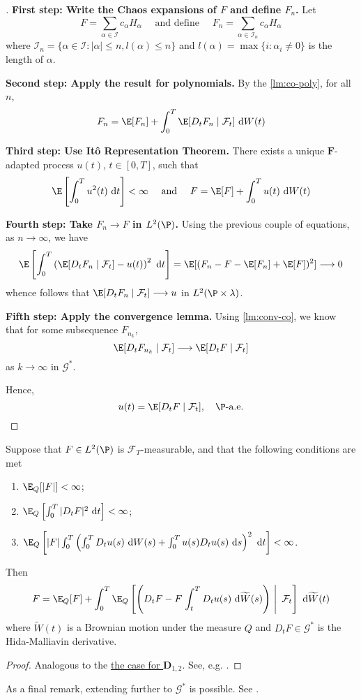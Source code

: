 \begin{proof}[]
  \textbf{First step: Write the Chaos expansions of $F$ and define $F_n$.} Let 
  \[
    F = \sum_{\alpha \in \mathcal{I}} c_\alpha H_\alpha \quad \text{ and define } \quad F_n = \sum_{\alpha \in \mathcal{I}_n} c_\alpha H_\alpha 
  \]
  where $\mathcal{I}_n = \{ \alpha \in \mathcal{I} : |\alpha| \le n, l(\alpha) \le n\}$ and $l(\alpha) = \max \{ i : \alpha_i \neq 0 \}$ is the length of $\alpha$. 

  \textbf{Second step: Apply the result for polynomials.} By the \ref{lm:co-poly}, for all $n$,
  \[
  F_n = \E [F_n] + \int_0^T \E [D_t F_n \mid \mathcal{F}_t] ~\mathrm{d}W(t)
  \]

  \textbf{Third step: Use Itô Representation Theorem.} There exists a unique $\mathbf{F}$-adapted process $u(t)$, $t \in [0,T]$, such that 
  \[
  \E \left[ \int_0^T u^2(t) ~\mathrm{d}t \right] < \infty \quad \text{ and } \quad F = \E [F] + \int_0^T u(t) ~\mathrm{d}W(t)
  \]

  \textbf{Fourth step: Take $F_n \to F$ in $L^2(\P)$.} Using the previous couple of equations, as $n \to \infty$, we have
  \[
  \E \left[ \int_0^T \left( \E [D_t F_n \mid \mathcal{F}_t] - u(t) \right)^2 ~\mathrm{d}t \right] = \E [(F_n - F - \E[F_n] + \E[F])^2] \longrightarrow 0
  \]
  whence follows that $\E [D_t F_n \mid \mathcal{F}_t] \longrightarrow u$ in $L^2(\P \times \lambda)$.

  \textbf{Fifth step: Apply the convergence lemma.} Using \ref{lm:conv-co}, we know that for some subsequence $F_{n_k}$, 
  \[
  \E [D_t F_{n_k} \mid \mathcal{F}_t] \longrightarrow \E [D_t F \mid \mathcal{F}_t]
  \]
  as $k \to \infty$ in $\mathcal{G}^\ast$. 
  
  Hence, 
  \[
  u(t) = \E [D_t F \mid \mathcal{F}_t], \quad \P \text{-a.e.}
  \]
\end{proof}

\begin{theorem}\label{thm:clark-ocone-change-measure-L2p}
Suppose that $F \in L^2(\P)$ is $\mathcal{F}_T$-measurable, and that the following conditions are met
\begin{enumerate}
	\item $\E_Q[|F|] < \infty$;
	\item $\E_Q \left[ \int_0^T |D_t F|^2 ~\mathrm{d}t \right] < \infty$;
	\item $\E_Q \left[ |F| \int_0^T \left( \int_0^T D_t u(s) ~\mathrm{d}W(s) + \int_0^T u(s) D_t u(s) ~\mathrm{d}s \right)^2 ~\mathrm{d}t \right] < \infty$. 
\end{enumerate}

Then
\begin{equation*}
	F = \E_Q[F] + \int_0^T \E_Q \left[ \left( D_t F - F \left. \int_t^T D_t u(s) ~\mathrm{d}\widetilde{W}(s) \right) ~ \right|~  \mathcal{F}_t \right] ~\mathrm{d}\widetilde{W}(t)
\end{equation*}
where $\widetilde{W}(t)$ is a Brownian motion under the measure $Q$ and $D_t F \in \mathcal{G}^\ast$ is the Hida-Malliavin derivative.
\end{theorem}

\begin{proof}
Analogous to the \hyperref[thm:clark-ocone-change-measure]{the case for $\mathbf{D}_{1,2}$}. See, e.g. \cite{okur2010white}.
\end{proof}

As a final remark, extending further to $\mathcal{G}^\ast$ is possible. See \cite{nunno2008malliavin}.